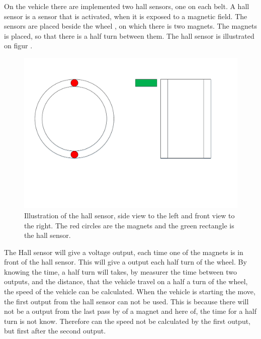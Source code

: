 On the vehicle there are implemented two hall sensors, one on each belt. A hall sensor is a sensor that is activated, when it is exposed to a magnetic field. The sensors are placed beside the wheel , on which there is two magnets. The magnets is placed, so that there is a half turn between them. The hall sensor is illustrated on figur .

 \begin{figure}[H]
	\centering
	\includegraphics[scale=0.5]{figures/HallSensorSide_Forward_view.pdf}
	\caption{Illustration of the hall sensor, side view to the left and front view to the right. The red circles are the magnets and the green rectangle is the hall sensor.}
	\label{fig:HallSensor}
\end{figure}

The Hall sensor will give a voltage output, each time one of the magnets is in front of the hall sensor. This will give a output each half turn of the wheel. By knowing the time, a half turn will takes, by measurer the time between two outputs, and the distance, that the vehicle travel on a half a turn of the wheel, the speed of the vehicle can be calculated.
When the vehicle is starting the move, the first output from the hall sensor can not be used. This is because there will not be a output from the last pass by of a magnet and here of, the time for a half turn is not know. Therefore can the speed not be calculated by the first output, but first after the second output.

